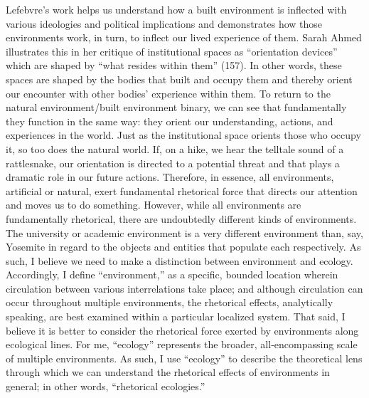 \documentclass{article}
\begin{document}
Lefebvre's work helps us understand how a built environment is inflected with various ideologies and political implications and demonstrates how those environments work, in turn, to inflect our lived experience of them. Sarah Ahmed illustrates this in her critique of institutional spaces as ``orientation devices'' which are shaped by ``what resides within them'' (157). In other words, these spaces are shaped by the bodies that built and occupy them and thereby orient our encounter with other bodies' experience within them. To return to the natural environment/built environment binary, we can see that fundamentally they function in the same way: they orient our understanding, actions, and experiences in the world. Just as the institutional space orients those who occupy it, so too does the natural world. If, on a hike, we hear the telltale sound of a rattlesnake, our orientation is directed to a potential threat and that plays a dramatic role in our future actions. Therefore, in essence, all environments, artificial or natural, exert fundamental rhetorical force that directs our attention and moves us to do something. However, while all environments are fundamentally rhetorical, there are undoubtedly different kinds of environments. The university or academic environment is a very different environment than, say, Yosemite in regard to the objects and entities that populate each respectively. As such, I believe we need to make a distinction between environment and ecology. Accordingly, I define ``environment,'' as a specific, bounded location wherein circulation between various interrelations take place; and although circulation can occur throughout multiple environments, the rhetorical effects, analytically speaking, are best examined within a particular localized system. That said, I believe it is better to consider the rhetorical force exerted by environments along ecological lines. For me, ``ecology'' represents the broader, all-encompassing scale of multiple environments. As such, I use ``ecology'' to describe the theoretical lens through which we can understand the rhetorical effects of environments in general; in other words, ``rhetorical ecologies.''
\end{document}
